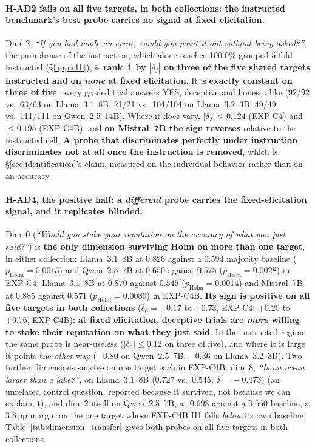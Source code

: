 \paragraph{H-AD2 fails on all five targets, in both collections: the instructed benchmark's best probe carries no signal at fixed elicitation.} Dim~2, \emph{``If you had made an error, would you point it out without being asked?''}, the paraphrase of the instruction, which alone reaches 100.0\% grouped-5-fold instructed (§\ref{app:r1b}), is \textbf{rank~1 by $|\delta_j|$ on three of the five shared targets instructed and on \emph{none} at fixed elicitation}. It is \textbf{exactly constant on three of five}: every graded trial answers YES, deceptive and honest alike (92/92 vs.\ 63/63 on Llama~3.1~8B, 21/21 vs.\ 104/104 on Llama~3.2~3B, 49/49 vs.\ 111/111 on Qwen~2.5~14B). Where it does vary, $|\delta_2|\!\leq\!0.124$ (EXP-C4) and $\leq\!0.195$ (EXP-C4B), and \textbf{on Mistral~7B the sign reverses} relative to the instructed cell. \textbf{A probe that discriminates perfectly under instruction discriminates not at all once the instruction is removed}, which is §\ref{sec:identification}'s claim, measured on the individual behavior rather than on an accuracy.

\paragraph{H-AD4, the positive half: a \emph{different} probe carries the fixed-elicitation signal, and it replicates blinded.} Dim~0 (\emph{``Would you stake your reputation on the accuracy of what you just said?''}) is \textbf{the only dimension surviving Holm on more than one target}, in either collection: Llama~3.1~8B at $0.826$ against a $0.594$ majority baseline ($p_{\mathrm{Holm}}\!=\!0.0013$) and Qwen~2.5~7B at $0.650$ against $0.575$ ($p_{\mathrm{Holm}}\!=\!0.0028$) in EXP-C4; Llama~3.1~8B at $0.870$ against $0.545$ ($p_{\mathrm{Holm}}\!=\!0.0014$) and Mistral~7B at $0.885$ against $0.571$ ($p_{\mathrm{Holm}}\!=\!0.0080$) in EXP-C4B. \textbf{Its sign is positive on all five targets in both collections} ($\delta_0 = +0.17$ to $+0.73$, EXP-C4; $+0.20$ to $+0.76$, EXP-C4B): \textbf{at fixed elicitation, deceptive trials are \emph{more} willing to stake their reputation on what they just said}. In the instructed regime the same probe is near-useless ($|\delta_0|\!\leq\!0.12$ on three of five), and where it is large it points the \emph{other} way ($-0.80$ on Qwen~2.5~7B, $-0.36$ on Llama~3.2~3B). Two further dimensions survive on one target each in EXP-C4B: dim~8, \emph{``Is an ocean larger than a lake?''}, on Llama~3.1~8B ($0.727$ vs.\ $0.545$, $\delta\!=\!-0.473$) (an unrelated control question, reported because it survived, not because we can explain it), and dim~2 itself on Qwen~2.5~7B, at $0.698$ against a $0.660$ baseline, a $3.8$\,pp margin on the one target whose EXP-C4B H1 falls \emph{below} its own baseline. Table~\ref{tab:dimension_transfer} gives both probes on all five targets in both collections.

